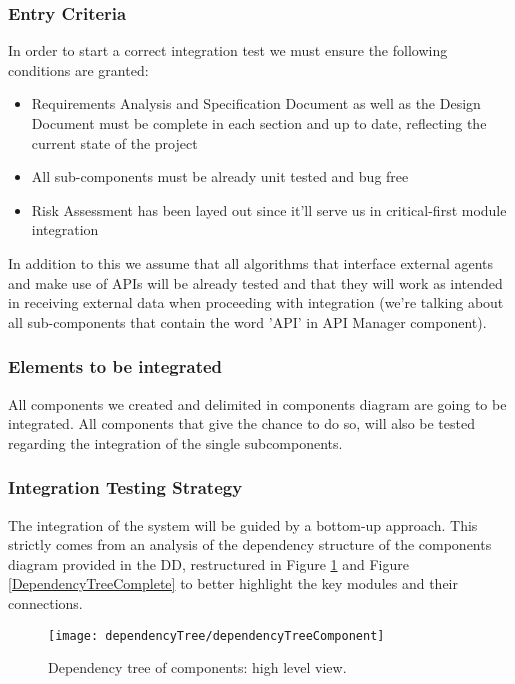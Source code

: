\subsubsection{Entry Criteria}
	In order to start a correct integration test we must ensure the following conditions are granted:

	\begin{itemize}
		\item Requirements Analysis and Specification Document as well as the Design Document must be complete in each section and up to date, reflecting the current state of the project
		\item All sub-components must be already unit tested and bug free
		\item Risk Assessment has been layed out since it'll serve us in critical-first module integration
	\end{itemize}

	In addition to this we assume that all algorithms that interface external agents and make use of APIs will be already tested and that they will work as intended in receiving external data when proceeding with integration (we're talking about all sub-components that contain the word 'API' in API Manager component).


\subsubsection{Elements to be integrated}
	All components we created and delimited in components diagram are going to be integrated. All components that give the chance to do so, will also be tested regarding the integration of the single subcomponents.
	


\subsubsection{Integration Testing Strategy}
	The integration of the system will be guided by a bottom-up approach. This strictly comes from an analysis of the dependency structure of the components diagram provided in the DD, restructured in Figure \ref{DependencyTreehighLevel} and Figure \ref{DependencyTreeComplete} to better highlight the key modules and their connections.
	
	\begin{figure}[H]
		\centering
		\texttt{[image: dependencyTree/dependencyTreeComponent]}
		\caption{Dependency tree of components: high level view.}
		\label{DependencyTreehighLevel}
	\end{figure}
	

